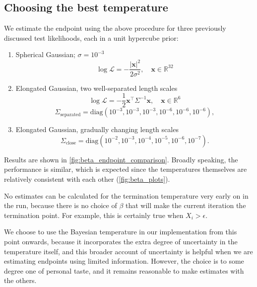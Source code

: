 \documentclass[usenatbib]{mnras}
\newcommand{\Like}{\mathcal{L}}
\begin{document}
\subsection{Choosing the best temperature}\label{sec:choosing_the_best_temperature}
We estimate the endpoint using the above procedure for three previously discussed test likelihoods, each in a unit hypercube prior:
\begin{enumerate}[leftmargin=*]
    \item Spherical Gaussian; $\sigma = 10^{-3}$
        \begin{equation}
        \log \Like = -\frac{|\bm{x}|^2}{2\sigma^2}, \quad \bm{x} \in \mathbb{R}^{32}
        \end{equation}
    \item Elongated Gaussian, two well-separated length scales 
        \begin{equation}
            \log\Like = -\frac{1}{2} \bm{x}^\intercal \Sigma^{-1}\bm{x}, \quad \bm{x} \in \mathbb{R}^6
        \end{equation}
        \begin{equation*}
            \Sigma_\mathrm{separated} = \mathrm{diag}(10^{-3}, 10^{-3}, 10^{-3}, 10^{-6}, 10^{-6}, 10^{-6}),
        \end{equation*}
    \item Elongated Gaussian, gradually changing length scales
        \begin{equation}
            \Sigma_\mathrm{close} = \mathrm{diag}(10^{-2}, 10^{-3}, 10^{-4}, 10^{-5}, 10^{-6}, 10^{-7}).
        \end{equation}
\end{enumerate}
Results are shown in \cref{fig:beta_endpoint_comparison}. Broadly speaking, the performance is similar, which is expected since the temperatures themselves are relatively consistent with each other (\cref{fig:beta_plots}).
\par
No estimates can be calculated for the termination temperature very early on in the run, because there is no choice of $\beta$ that will make the current iteration the termination point. For example, this is certainly true when $X_i > \epsilon$.
\par
We choose to use the Bayesian temperature in our implementation from this point onwards, because it incorporates the extra degree of uncertainty in the temperature itself, and this broader account of uncertainty is helpful when we are estimating endpoints using limited information. However, the choice is to some degree one of personal taste, and it remains reasonable to make estimates with the others.
\end{document}
